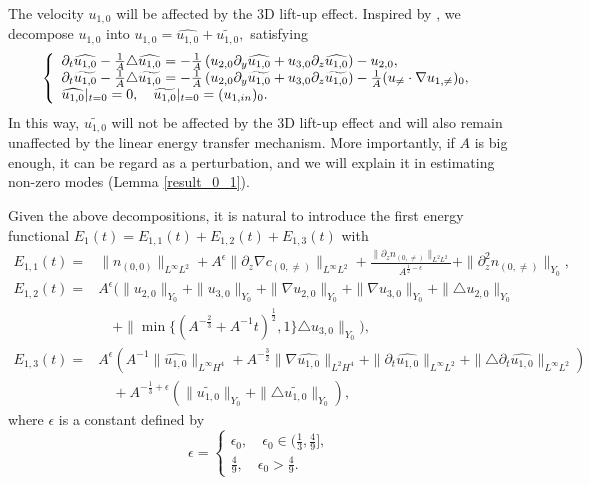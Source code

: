 \documentclass[12pt, reqno]{amsart}
\numberwithin{equation}{section}
\begin{document}
	
	
	
	The velocity $u_{1,0}$ will be affected by the 3D lift-up effect.
	Inspired by \cite{Chen1}, we decompose $u_{1,0}$ into 
	$u_{1,0}=\widehat{u_{1,0}}+\widetilde{u_{1,0}},$ satisfying
	\begin{equation}\label{eq:u10decom}
		\left\{
		\begin{array}{lr}
			\partial_t\widehat{u_{1,0}}-\frac{1}{A}\triangle\widehat{u_{1,0}}
			=-\frac{1}{A}\left(u_{2,0}\partial_y\widehat{u_{1,0}}+u_{3,0}\partial_z\widehat{u_{1,0}}\right)-u_{2,0},\\
			\partial_t\widetilde{u_{1,0}}-\frac{1}{A}\triangle\widetilde{u_{1,0}}
			=-\frac{1}{A}\left(u_{2,0}\partial_y\widetilde{u_{1,0}}+u_{3,0}\partial_z\widetilde{u_{1,0}}\right)-\frac{1}{A}(u_{\neq}\cdot \nabla u_{1,\neq})_0,\\
			\widehat{u_{1,0}}|_{t=0}=0,\quad\widetilde{u_{1,0}}|_{t=0}=(u_{1,\rm in})_0.
		\end{array}
		\right.
	\end{equation}
	In this way, $\widetilde{u_{1,0}}$ will not be affected by the 3D lift-up effect and will also remain unaffected by the linear energy transfer mechanism. 
	More importantly, if $A$ is big enough, it can be regard as a perturbation, and we will explain it in estimating non-zero modes (Lemma \ref{result_0_1}).
	
	Given the above decompositions, it is natural to introduce the first energy functional
	$E_1(t)=E_{1,1}(t)+E_{1,2}(t)+E_{1,3}(t)$ with
	\begin{equation}\label{eq:E1}
		\begin{aligned}
			E_{1,1}(t)=&\|n_{(0,0)}\|_{L^{\infty}L^2}
			+A^{\epsilon}\|\partial_z\nabla c_{(0,\neq)}\|_{L^{\infty}L^2}
			+\frac{\|\partial_zn_{(0,\neq)}\|_{L^2L^2} }{A^{\frac12-\epsilon}}
			+\|\partial_z^2 n_{(0,\neq)}\|_{Y_0},\\
			E_{1,2}(t)=&A^{\epsilon}
			\big(\|u_{2,0}\|_{Y_0}+\|u_{3,0}\|_{Y_0}+\|\nabla u_{2,0}\|_{Y_0}
			+\|\nabla u_{3,0}\|_{Y_0}+\|\triangle u_{2,0}\|_{Y_0}
			\\
			&\quad+\|\min\{(A^{-\frac{2}{3}}+A^{-1}t)^{\frac{1}{2}},1\}\triangle u_{3,0}\|_{Y_0}\big),\\
			E_{1,3}(t)=&A^{\epsilon}(A^{-1}{\|\widehat{u_{1,0}}\|_{L^{\infty}H^4}}
			+A^{-\frac32}{\|\nabla\widehat{u_{1,0}}\|_{L^{2}H^4}}+\|\partial_t\widehat{ u_{1,0}}\|_{L^{\infty}L^{2}}+\|\triangle\partial_t\widehat{ u_{1,0}}\|_{L^{\infty}L^{2}})\\
			&\quad+A^{-\frac13+\epsilon}(\|\widetilde{u_{1,0}}\|_{Y_0}
			+\|\triangle\widetilde{u_{1,0}}\|_{Y_0}),
		\end{aligned}
	\end{equation}
	where $\epsilon$ is a constant defined by $$\epsilon=\left\{\begin{array}{lr}
		\epsilon_0,\quad \epsilon_0\in(\frac13,\frac49],\\
		\frac{4}{9},\quad \epsilon_0>\frac49.
	\end{array}\right.$$
	
\end{document}
